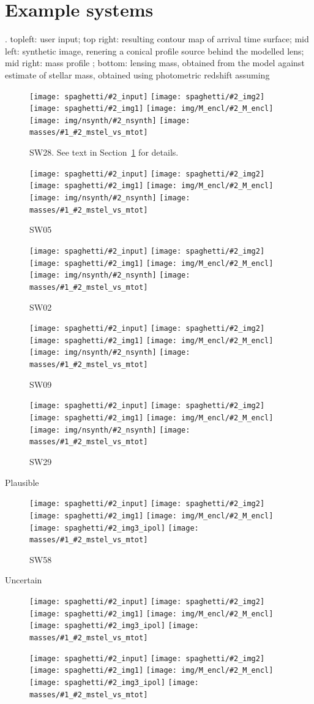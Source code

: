 \documentclass[fleqn,usenatbib]{mnras}
\newcommand{\inclfig}[2]{
  \centering
	\texttt{[image: spaghetti/\#2\_input]}%
	\texttt{[image: spaghetti/\#2\_img2]}
	\texttt{[image: spaghetti/\#2\_img1]}%
	\texttt{[image: img/M\_encl/\#2\_M\_encl]}
	\texttt{[image: spaghetti/\#2\_img3\_ipol]}%
	\texttt{[image: masses/\#1\_\#2\_mstel\_vs\_mtot]}
}
\newcommand{\inclfign}[2]{
  \centering
	\texttt{[image: spaghetti/\#2\_input]}%
	\texttt{[image: spaghetti/\#2\_img2]}
	\texttt{[image: spaghetti/\#2\_img1]}%
	\texttt{[image: img/M\_encl/\#2\_M\_encl]}
	\texttt{[image: img/nsynth/\#2\_nsynth]}%
	\texttt{[image: masses/\#1\_\#2\_mstel\_vs\_mtot]}
}
\begin{document}
\section{Example systems}\label{sec:examples}

. topleft: user input; top right: resulting contour map of arrival
time surface; mid left: synthetic image, renering a conical profile
source behind the modelled lens; mid right: mass profile  ; bottom: lensing mass, obtained from
the model against estimate of stellar mass, obtained using photometric
redshift assuming 

\begin{figure}
  \inclfign{SW28}{ASW0007xrs_JHC3J2HYV7}
  \caption{SW28.  See text in Section~\ref{sec:examples} for details.}
  \label{fig:SW28}
\end{figure}

\begin{figure}
  \inclfign{SW05}{ASW0007k4r_AJIBCHQ6EM}
  \caption{SW05}
  \label{fig:SW05}
\end{figure}

\begin{figure}
  \inclfign{SW02}{ASW000619d_011489}
  \caption{SW02}
  \label{fig:SW02}
\end{figure}

\begin{figure}
  \inclfign{SW09}{ASW0002asp_5EKMWWVJHL}
  \caption{SW09}
  \label{fig:SW09}
\end{figure}

\begin{figure}
  \inclfign{SW29}{ASW0008qsm_TOFS7JNGEK}
  \caption{SW29}
  \label{fig:SW29}
\end{figure}

Plausible

\begin{figure}
  \inclfig{SW58}{ASW0007iwp_4XBJWT3COV}
  \caption{SW58}
  \label{fig:SW58}
\end{figure}

Uncertain

\begin{figure}
  \inclfig{SW36}{ASW000096t_7IPP7LWVOF}
  \caption{}
  \label{fig:SW36}
\end{figure}

\begin{figure}
  \inclfig{SW19}{ASW0001ld7_OS3CYAKLRT}
  \caption{}
  \label{fig:SW19}
\end{figure}
\end{document}
